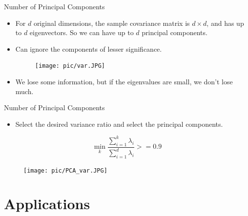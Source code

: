 \documentclass[serif, aspectratio=169]{beamer}
\begin{document}
\begin{frame}{Number of Principal Components}
    \begin{itemize}
        \item For $d$ original dimensions, the sample covariance matrix is $d \times d$, and has up to $d$ eigenvectors. So we can have up to $d$ principal components.
        \item Can ignore the components of lesser significance.
        \begin{figure}[htpb]
            \begin{center}
                \texttt{[image: pic/var.JPG]}
            \end{center}
        \end{figure}
        \item We lose some information, but if the eigenvalues are small, we don’t lose much.
    \end{itemize}
\end{frame}

\begin{frame}{Number of Principal Components}
    \begin{minipage}{0.4\textwidth}
         \begin{itemize}
            \item Select the desired variance ratio and select the principal components.
        \end{itemize}
         $$\min_k \frac{\sum_{i=1}^{k} \lambda_i}{\sum_{i=1}^{d} \lambda_i} >= 0.9$$
    \end{minipage}
    \begin{minipage}{0.55\textwidth}
        \begin{figure}[htpb]
            \begin{center}
                \texttt{[image: pic/PCA\_var.JPG]}
            \end{center}
        \end{figure}
    \end{minipage}
\end{frame}

\section{Applications}
\end{document}
